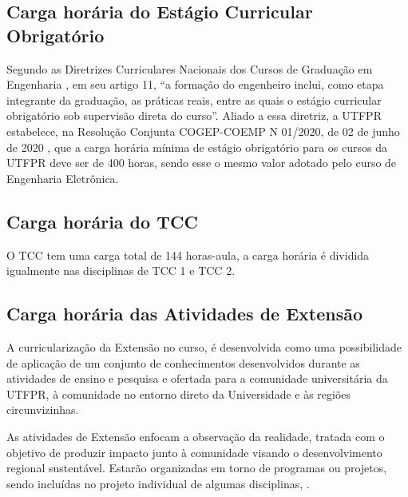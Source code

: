 
\subsection{Carga horária do Estágio Curricular Obrigatório}

Segundo as Diretrizes Curriculares Nacionais dos Cursos de Graduação em Engenharia \cite{dcneng}, em seu artigo 11, ``a formação  do  engenheiro  inclui,  como  etapa  integrante da  graduação, as práticas reais, entre as quais o estágio curricular obrigatório sob supervisão direta do curso''. Aliado a essa diretriz, a UTFPR estabelece, na Resolução Conjunta COGEP-COEMP N\textordmasculine{} 01/2020, de 02 de junho de 2020 \cite{cogepcoemp1:2020}, que a carga horária mínima de estágio obrigatório para os cursos da UTFPR deve ser de 400 horas, sendo esse o mesmo valor adotado pelo curso de Engenharia Eletrônica.


\subsection{Carga horária do TCC}

O TCC tem uma carga total de 144 horas-aula, a carga horária é dividida igualmente nas disciplinas de TCC 1 e TCC 2.



\subsection{Carga horária das Atividades de Extensão}
\label{sub:extch}

A curricularização da Extensão no curso, é desenvolvida como uma possibilidade de aplicação de um conjunto de conhecimentos desenvolvidos durante as atividades de ensino e pesquisa e ofertada para a comunidade universitária da UTFPR, à comunidade no entorno direto da Universidade e às regiões circunvizinhas.

As atividades de Extensão enfocam a observação da realidade, tratada com o objetivo de produzir impacto junto à comunidade visando o desenvolvimento regional sustentável. Estarão organizadas em torno de programas ou projetos, sendo incluídas no projeto individual de algumas disciplinas, .


